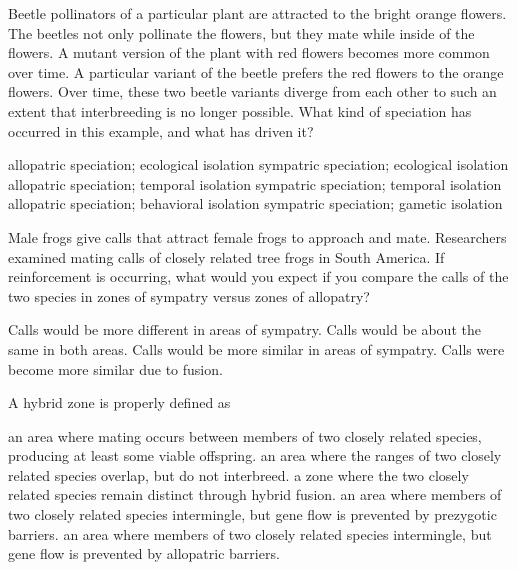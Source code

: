 \question
Beetle pollinators of a particular plant are attracted to the bright orange flowers. The beetles not only pollinate the flowers, but they mate while inside of the flowers. A mutant version of the plant with red flowers becomes more common over time. A particular variant of the beetle prefers the red flowers to the orange flowers. Over time, these two beetle variants diverge from each other to such an extent that interbreeding is no longer possible. What kind of speciation has occurred in this example, and what has driven it?

\begin{choices}
\choice allopatric speciation; ecological isolation%
\correctchoice sympatric speciation; ecological isolation%
\choice allopatric speciation; temporal isolation%
\choice sympatric speciation; temporal isolation%
\choice allopatric speciation; behavioral isolation%
\choice sympatric speciation; gametic isolation%
\end{choices}

\question
Male frogs give calls that attract female frogs to approach and mate. Researchers examined mating calls of closely related tree frogs in South America. If reinforcement is occurring, what would you expect if you compare the calls of the two species in zones of sympatry versus zones of allopatry? 

\begin{choices}
\correctchoice Calls would be more different in areas of sympatry. %
\choice Calls would be about the same in both areas. %
\choice Calls would be more similar in areas of sympatry. %
\choice Calls were become more similar due to fusion. %
\end{choices}

\question
A hybrid zone is properly defined as 

\begin{choices}
\correctchoice an area where mating occurs between members of two closely related species, producing at least some viable offspring. %
\choice an area where the ranges of two closely related species overlap, but do not interbreed. %
\choice a zone where the two closely related species remain distinct through hybrid fusion. %
\choice an area where members of two closely related species intermingle, but gene flow is prevented by prezygotic barriers. %
\choice an area where members of two closely related species intermingle, but gene flow is prevented by allopatric barriers. %
\end{choices}


